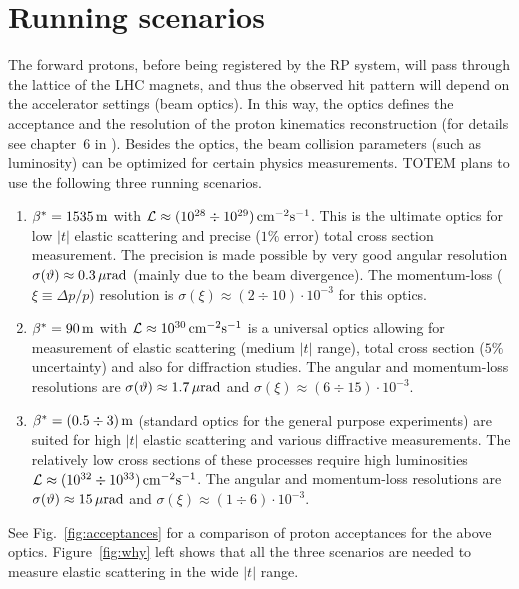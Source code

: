 \documentclass{cimento}
\def\th{\vartheta}
\def\be{\beta}
\def\De{\Delta}
\def\si{\sigma}
\def\un#1{\,{\rm #1}}
\begin{document}
\section{Running scenarios}\label{sec:scenarios}

The forward protons, before being registered by the RP system, will pass through the lattice of the LHC magnets, and thus the observed hit pattern will depend on the accelerator settings (beam optics). In this way, the optics defines the acceptance and the resolution of the proton kinematics reconstruction (for details see chapter~6 in \cite{jinst}). Besides the optics, the beam collision parameters (such as luminosity) can be optimized for certain physics measurements. TOTEM plans to use the following three running scenarios.


\begin{enumerate}
\item {\em $\be^* = 1535\un{m}$} with ${\cal L} \approx (10^{28} \div 10^{29})\un{cm^{-2}s^{-1}}$. This is the ultimate optics for low $|t|$ elastic scattering and precise ($1\%$ error) total cross section measurement. The precision is made possible by very good angular resolution $\si(\th) \approx 0.3\un{\mu rad}$ (mainly due to the beam divergence). The momentum-loss ($\xi\equiv\De p/p$) resolution is $\si(\xi) \approx (2\div 10)\cdot10^{-3}$ for this optics.

\item {\em $\be^* = 90\un{m}$} with ${\cal L} \approx 10^{30}\un{cm^{-2}s^{-1}}$ is a universal optics allowing for measurement of elastic scattering (medium $|t|$ range), total cross section ($5\%$ uncertainty) and also for diffraction studies. The angular and momentum-loss resolutions are $\si(\th) \approx 1.7\un{\mu rad}$ and $\si(\xi) \approx (6\div 15)\cdot 10^{-3}$.

\item {\em $\be^* = (0.5 \div 3)\un{m}$} (standard optics for the general purpose experiments) are suited for high $|t|$ elastic scattering and various diffractive measurements. The relatively low cross sections of these processes require high luminosities ${\cal L} \approx (10^{32}\div10^{33})\un{cm^{-2}s^{-1}}$. The angular and momentum-loss resolutions are $\si(\th) \approx 15\un{\mu rad}$ and $\si(\xi) \approx (1\div 6)\cdot 10^{-3}$.
\end{enumerate}


See Fig.~\ref{fig:acceptances} for a comparison of proton acceptances for the above optics. Figure~\ref{fig:why} left shows that all the three scenarios are needed to measure elastic scattering in the wide $|t|$ range.
\end{document}
